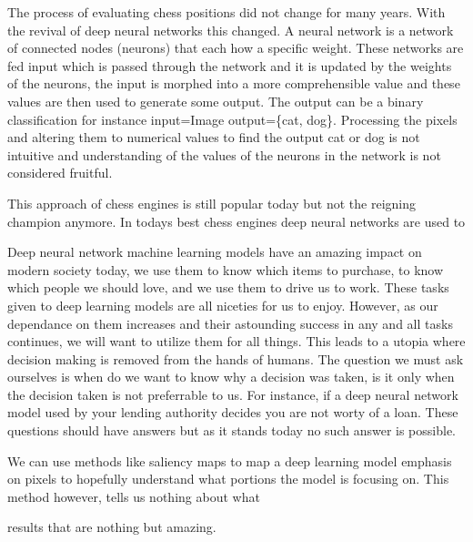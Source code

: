 The process of evaluating chess positions did not change for many years. With the revival
of deep neural networks this changed. A neural network is a network of connected nodes (neurons)
that each how a specific weight. These networks are fed input which is passed through the
network and it is updated by the weights of the neurons, the input is morphed into
a more comprehensible value and these values are then used to generate some output.
The output can be a binary classification for instance input=Image output=\{cat, dog\}.
Processing the pixels and altering them to numerical values to find the output cat or dog
is not intuitive and understanding of the values of the neurons in the network
is not considered fruitful.



This approach of
chess engines is still popular today but not the reigning champion anymore. In todays
best chess engines deep neural networks are used to

Deep neural network machine learning models have an amazing impact on modern society today,
we use them to know which items to purchase, to know which people we should love, and we
use them to drive us to work. These tasks given to deep learning models are all niceties
for us to enjoy. However, as our dependance on them increases and their astounding success
in any and all tasks continues, we will want to utilize them for all things. This leads
to a utopia where decision making is removed from the hands of humans. The question we
must ask ourselves is when do we want to know why a decision was taken, is it only when
the decision taken is not preferrable to us. For instance, if a deep neural network model
used by your lending authority decides you are not worty of a loan. These questions should
have answers but as it stands today no such answer is possible.

We can use methods like saliency maps to map a deep learning model emphasis on pixels to
hopefully understand what portions the model is focusing on. This method however, tells us
nothing about what

results that are nothing but amazing.
